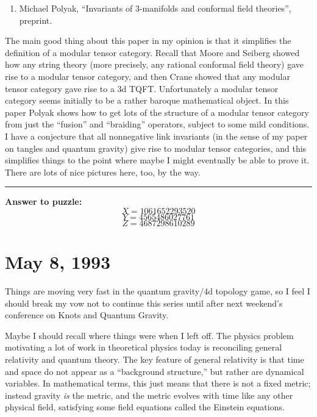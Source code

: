 \documentclass{article}
\def\tightlist{}
\begin{document}
\begin{enumerate}
\def\labelenumi{\arabic{enumi})}
\setcounter{enumi}{5}
\tightlist
\item
  Michael  Polyak, ``Invariants of 3-manifolds and conformal field theories'', preprint.
\end{enumerate}
\noindent
The main good thing about this paper in my opinion is that it simplifies
the definition of a modular tensor category. Recall that Moore and
Seiberg showed how any string theory (more precisely, any rational
conformal field theory) gave rise to a modular tensor category, and then
Crane showed that any modular tensor category gave rise to a 3d TQFT.
Unfortunately a modular tensor category seems initially to be a rather
baroque mathematical object. In this paper Polyak shows how to get lots
of the structure of a modular tensor category from just the ``fusion''
and ``braiding'' operators, subject to some mild conditions. I have a
conjecture that all nonnegative link invariants (in the sense of my
paper on tangles and quantum gravity) give rise to modular tensor
categories, and this simplifies things to the point where maybe I might
eventually be able to prove it. There are lots of nice pictures here,
too, by the way.

\begin{center}\rule{0.5\linewidth}{0.5pt}\end{center}

\textbf{Answer to puzzle:} \[X = 1061652293520\] \[Y = 4565486027761\]
\[Z = 4687298610289\]



\hypertarget{week14}{%
\section{May 8, 1993}\label{week14}}

Things are moving very fast in the quantum gravity/4d topology game, so
I feel I should break my vow not to continue this series until after
next weekend's conference on Knots and Quantum Gravity.

Maybe I should recall where things were when I left off. The physics
problem motivating a lot of work in theoretical physics today is
reconciling general relativity and quantum theory. The key feature of
general relativity is that time and space do not appear as a
``background structure,'' but rather are dynamical variables. In
mathematical terms, this just means that there is not a fixed metric;
instead gravity \emph{is} the metric, and the metric evolves with time
like any other physical field, satisfying some field equations called
the Einstein equations.
\end{document}
